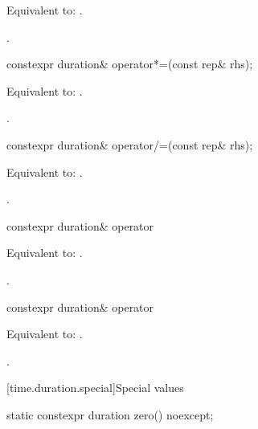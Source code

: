 \begin{itemdescr}
\pnum
\effects
Equivalent to: .

\pnum
\returns
{}.
\end{itemdescr}

%
\begin{itemdecl}
constexpr duration& operator*=(const rep& rhs);
\end{itemdecl}

\begin{itemdescr}
\pnum
\effects
Equivalent to: .

\pnum
\returns
{}.
\end{itemdescr}

%
\begin{itemdecl}
constexpr duration& operator/=(const rep& rhs);
\end{itemdecl}

\begin{itemdescr}
\pnum
\effects
Equivalent to: .

\pnum
\returns
{}.
\end{itemdescr}

%
\begin{itemdecl}
constexpr duration& operator%
\end{itemdecl}

\begin{itemdescr}
\pnum
\effects
Equivalent to: .

\pnum
\returns
{}.
\end{itemdescr}

%
\begin{itemdecl}
constexpr duration& operator%
\end{itemdecl}

\begin{itemdescr}
\pnum
\effects
Equivalent to: .

\pnum
\returns
{}.
\end{itemdescr}


[time.duration.special]{Special values}

%
\begin{itemdecl}
static constexpr duration zero() noexcept;
\end{itemdecl}

